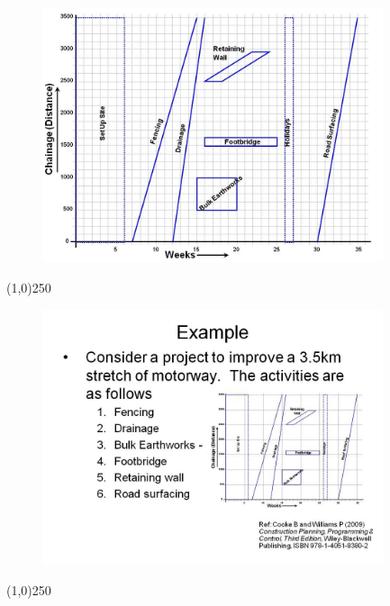 \begin{frame}
\begin{figure}
	\centering
		\includegraphics[width = 10.0cm]{oldnotes/Slide303.jpg}
\end{figure}
\end{frame}
\begin{center}\line(1,0){250}\end{center}




\begin{frame}
\begin{figure}
	\centering
		\includegraphics[width = 10.0cm]{oldnotes/Slide304.jpg}
\end{figure}
\end{frame}
\begin{center}\line(1,0){250}\end{center}




